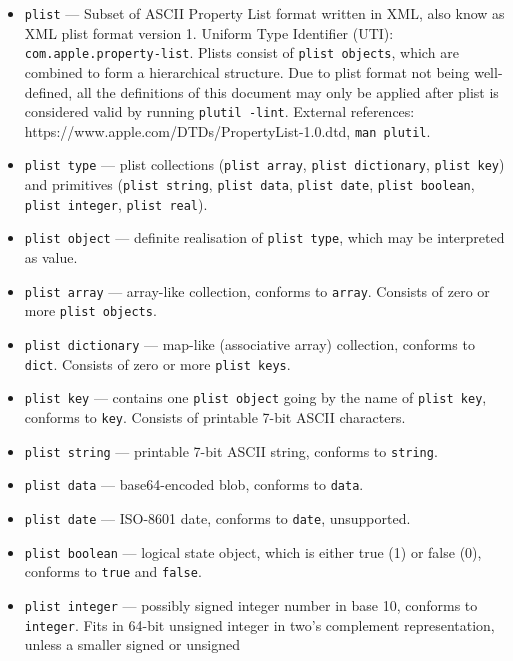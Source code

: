 \documentclass[]{article}
\begin{document}
\begin{itemize}

\item
  \texttt{plist} --- Subset of ASCII Property List format written in
  XML, also know as XML plist format version 1. Uniform Type Identifier
  (UTI): \texttt{com.apple.property-list}. Plists consist of
  \texttt{plist\ objects}, which are combined to form a hierarchical
  structure. Due to plist format not being well-defined, all the
  definitions of this document may only be applied after plist is
  considered valid by running \texttt{plutil\ -lint}. External
  references: https://www.apple.com/DTDs/PropertyList-1.0.dtd,
  \texttt{man\ plutil}.
\item
  \texttt{plist\ type} --- plist collections (\texttt{plist\ array},
  \texttt{plist\ dictionary}, \texttt{plist\ key}) and primitives
  (\texttt{plist\ string}, \texttt{plist\ data}, \texttt{plist\ date},
  \texttt{plist\ boolean}, \texttt{plist\ integer},
  \texttt{plist\ real}).
\item
  \texttt{plist\ object} --- definite realisation of
  \texttt{plist\ type}, which may be interpreted as value.
\item
  \texttt{plist\ array} --- array-like collection, conforms to
  \texttt{array}. Consists of zero or more \texttt{plist\ objects}.
\item
  \texttt{plist\ dictionary} --- map-like (associative array)
  collection, conforms to \texttt{dict}. Consists of zero or more
  \texttt{plist\ keys}.
\item
  \texttt{plist\ key} --- contains one \texttt{plist\ object} going by
  the name of \texttt{plist\ key}, conforms to \texttt{key}. Consists of
  printable 7-bit ASCII characters.
\item
  \texttt{plist\ string} --- printable 7-bit ASCII string, conforms to
  \texttt{string}.
\item
  \texttt{plist\ data} --- base64-encoded blob, conforms to
  \texttt{data}.
\item
  \texttt{plist\ date} --- ISO-8601 date, conforms to \texttt{date},
  unsupported.
\item
  \texttt{plist\ boolean} --- logical state object, which is either true
  (1) or false (0), conforms to \texttt{true} and \texttt{false}.
\item
  \texttt{plist\ integer} --- possibly signed integer number in base 10,
  conforms to \texttt{integer}. Fits in 64-bit unsigned integer in two's
  complement representation, unless a smaller signed or unsigned

\end{itemize}
\end{document}
